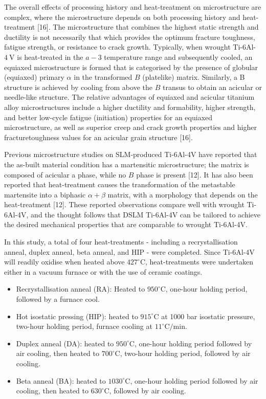 \documentclass[10pt]{article}
\begin{document}
The overall effects of processing history and heat-treatment on microstructure are complex, where the microstructure depends on both processing history and heat-treatment [16]. The microstructure that combines the highest static strength and ductility is not necessarily that which provides the optimum fracture toughness, fatigue strength, or resistance to crack growth. Typically, when wrought Ti-6Al- $4 \mathrm{~V}$ is heat-treated in the $a-3$ temperature range and subsequently cooled, an equiaxed microstructure is formed that is categorised by the presence of globular (equiaxed) primary $\alpha$ in the transformed $B$ (platelike) matrix. Similarly, a B structure is achieved by cooling from above the $B$ transus to obtain an acicular or needle-like structure. The relative advantages of equiaxed and acicular titanium alloy microstructures include a higher ductility and formability, higher strength, and better low-cycle fatigue (initiation) properties for an equiaxed microstructure, as well as superior creep and crack growth properties and higher fracturetoughness values for an acicular grain structure [16].

Previous microstructure studies on SLM-produced Ti-6Al-4V have reported that the as-built material condition has a martensitic microstructure; the matrix is composed of acicular a phase, while no $B$ phase is present [12]. It has also been reported that heat-treatment causes the transformation of the metastable martensite into a biphasic $\alpha+\beta$ matrix, with a morphology that depends on the heat-treatment [12]. These reported observations compare well with wrought Ti-6Al-4V, and the thought follows that DSLM Ti-6Al-4V can be tailored to achieve the desired mechanical properties that are comparable to wrought Ti-6Al-4V.

In this study, a total of four heat-treatments - including a recrystallisation anneal, duplex anneal, beta anneal, and HIP - were completed. Since Ti-6Al-4V will readily oxidise when heated above $427^{\circ} \mathrm{C}$, heat-treatments were undertaken either in a vacuum furnace or with the use of ceramic coatings.

\begin{itemize}
  \item Recrystallisation anneal (RA): Heated to $950^{\circ} \mathrm{C}$, one-hour holding period, followed by a furnace cool.

  \item Hot isostatic pressing (HIP): heated to $915^{\circ} \mathrm{C}$ at 1000 bar isostatic pressure, two-hour holding period, furnace cooling at $11^{\circ} \mathrm{C} / \mathrm{min}$.

  \item Duplex anneal (DA): heated to $950^{\circ} \mathrm{C}$, one-hour holding period followed by air cooling, then heated to $700^{\circ} \mathrm{C}$, two-hour holding period, followed by air cooling.

  \item Beta anneal (BA): heated to $1030^{\circ} \mathrm{C}$, one-hour holding period followed by air cooling, then heated to $630^{\circ} \mathrm{C}$, followed by air cooling.

\end{itemize}
\end{document}
